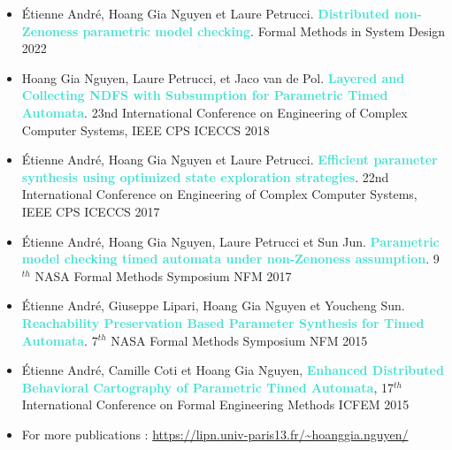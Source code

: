\documentclass[10pt,a4paper,ragged2e]{altacv}
\begin{document}
	\begin{itemize}
		\item Étienne André, Hoang Gia Nguyen et  Laure Petrucci. \textcolor{Turquoise}{\textbf{Distributed non-Zenoness parametric model checking}}. Formal Methods in System Design 2022
		\item Hoang Gia Nguyen, Laure Petrucci, et Jaco van de Pol. \textcolor{Turquoise}{\textbf{Layered and Collecting NDFS with Subsumption for Parametric Timed Automata}}. 23nd International Conference on Engineering of Complex Computer Systems, IEEE CPS {ICECCS 2018}
		\item Étienne André, Hoang Gia Nguyen et Laure Petrucci. \textcolor{Turquoise}{\textbf{Efficient parameter synthesis using optimized state exploration strategies}}. 22nd International Conference on Engineering of Complex Computer Systems, IEEE CPS {ICECCS 2017}
		\item Étienne André, Hoang Gia Nguyen,  Laure Petrucci et Sun Jun. \textcolor{Turquoise}{\textbf{Parametric model checking timed automata under non-Zenoness assumption}}. 
		9$^{th}$ NASA Formal Methods Symposium {NFM 2017}
		\item Étienne André, Giuseppe Lipari, Hoang Gia Nguyen et Youcheng Sun. \textcolor{Turquoise}{\textbf{Reachability Preservation Based Parameter Synthesis for Timed Automata}}. 
		7$^{th}$ NASA Formal Methods Symposium {NFM 2015}
		\item Étienne André, Camille Coti et Hoang Gia Nguyen, \textcolor{Turquoise}{\textbf{Enhanced Distributed Behavioral Cartography of Parametric Timed Automata}}, 17$^{th}$ International Conference on Formal Engineering Methods ICFEM 2015
		
		\item For more publications : \href{https://lipn.univ-paris13.fr/\textasciitilde{}hoanggia.nguyen/}{https://lipn.univ-paris13.fr/\textasciitilde{}hoanggia.nguyen/}
	\end{itemize}
	
%	
%	
\end{document}
